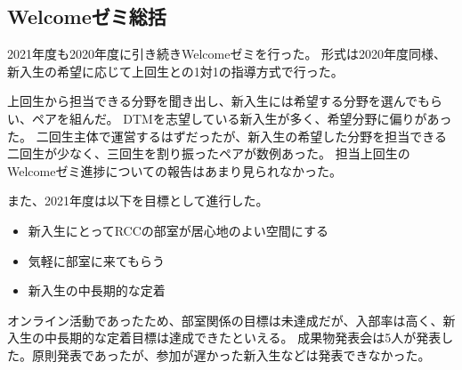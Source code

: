 \subsection*{Welcomeゼミ総括}


2021年度も2020年度に引き続きWelcomeゼミを行った。
形式は2020年度同様、新入生の希望に応じて上回生との1対1の指導方式で行った。

上回生から担当できる分野を聞き出し、新入生には希望する分野を選んでもらい、ペアを組んだ。
DTMを志望している新入生が多く、希望分野に偏りがあった。
二回生主体で運営するはずだったが、新入生の希望した分野を担当できる二回生が少なく、三回生を割り振ったペアが数例あった。
担当上回生のWelcomeゼミ進捗についての報告はあまり見られなかった。

また、2021年度は以下を目標として進行した。
\begin{itemize}
	\item 新入生にとってRCCの部室が居心地のよい空間にする
	\item 気軽に部室に来てもらう
	\item 新入生の中長期的な定着
\end{itemize}

オンライン活動であったため、部室関係の目標は未達成だが、入部率は高く、新入生の中長期的な定着目標は達成できたといえる。
成果物発表会は5人が発表した。原則発表であったが、参加が遅かった新入生などは発表できなかった。